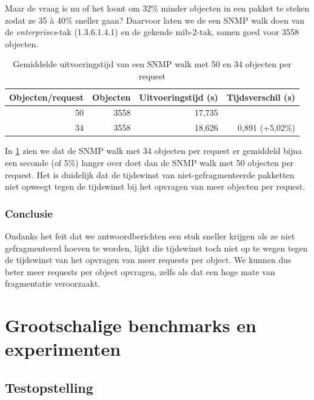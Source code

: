 Maar de vraag is nu of het loont om 32\% minder objecten in een pakket te steken zodat ze 35 à 40\% sneller gaan?
Daarvoor laten we de \nwmretriever{} een SNMP walk doen van de \textit{enterprises}-tak (1.3.6.1.4.1) en de gekende mib-2-tak, samen goed voor 3558 objecten.

\begin{table}[h]
\centering
\begin{tabular}{@{}rrrr@{}}
\toprule
Objecten/request & Objecten & Uitvoeringstijd (s) & Tijdsverschil (s) \\ \midrule
50               & 3558     & 17,735              &                   \\
34               & 3558     & 18,626              & 0,891 (+5,02\%)   \\ \bottomrule
\end{tabular}
\caption{Gemiddelde uitvoeringstijd van een SNMP walk met 50 en 34 objecten per request}
\label{tabel-fragmentatie-uitvoeringstijd}
\end{table}

In \cref{tabel-fragmentatie-uitvoeringstijd} zien we dat de SNMP walk met 34 objecten per request er gemiddeld bijna een seconde (of 5\%) langer over doet
dan de SNMP walk met 50 objecten per request.
Het is duidelijk dat de tijdswinst van niet-gefragmenteerde pakketten niet opweegt tegen de tijdswinst bij het opvragen van meer objecten per request.

\subsubsection{Conclusie}

Ondanks het feit dat we antwoordberichten een stuk sneller krijgen als ze niet gefragmenteerd hoeven te worden,
lijkt die tijdswinst toch niet op te wegen tegen de tijdswinst van het opvragen van meer requests per object.
We kunnen dus beter meer requests per object opvragen, zelfs als dat een hoge mate van fragmentatie veroorzaakt.


\section{Grootschalige benchmarks en experimenten}


\subsection{Testopstelling}

